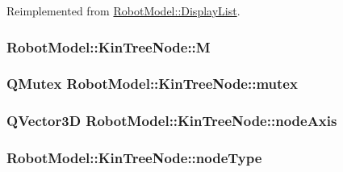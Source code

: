 Reimplemented from \hyperlink{class_robot_model_1_1_display_list}{RobotModel::DisplayList}.\hypertarget{class_robot_model_1_1_kin_tree_node_adc4909829a61513d89a23ebbf69d8243}{
\subsubsection[{M}]{ {\bf RobotModel::KinTreeNode::M}}}
\label{class_robot_model_1_1_kin_tree_node_adc4909829a61513d89a23ebbf69d8243}
\hypertarget{class_robot_model_1_1_kin_tree_node_ab2b663f51d01546b6e45be794a425438}{
\subsubsection[{mutex}]{\setlength{\rightskip}{0pt plus 5cm}QMutex {\bf RobotModel::KinTreeNode::mutex}}}
\label{class_robot_model_1_1_kin_tree_node_ab2b663f51d01546b6e45be794a425438}
\hypertarget{class_robot_model_1_1_kin_tree_node_af69707fb14705d4c1ab4ec6480e18b7e}{
\subsubsection[{nodeAxis}]{\setlength{\rightskip}{0pt plus 5cm}QVector3D {\bf RobotModel::KinTreeNode::nodeAxis}}}
\label{class_robot_model_1_1_kin_tree_node_af69707fb14705d4c1ab4ec6480e18b7e}
\hypertarget{class_robot_model_1_1_kin_tree_node_acc89f79d42901042ca47a7b56761d4b1}{
\subsubsection[{nodeType}]{ {\bf RobotModel::KinTreeNode::nodeType}}}
